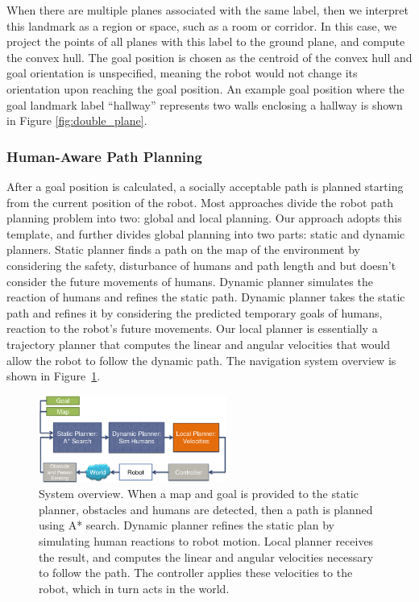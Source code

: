 \documentclass[3p]{elsarticle}
\begin{document}
When there are multiple planes associated with the same label, then we interpret this landmark as a region or space, such as a room or corridor. In this case, we project the points of all planes with this label to the ground plane, and compute the convex hull. The goal position is chosen as the centroid of the convex hull and goal orientation is unspecified, meaning the robot would not change its orientation upon reaching the goal position. An example goal position where the goal landmark label ``hallway'' represents two walls enclosing a hallway is shown in Figure \ref{fig:double_plane}.

\subsubsection{Human-Aware Path Planning}
\label{sec:human_aware_path_planning}

After a goal position is calculated, a socially acceptable path is planned starting from the current position of the robot. Most approaches divide the robot path planning problem into two: global and local planning. Our approach adopts this template, and further divides global planning into two parts: static and dynamic planners. Static planner finds a path on the map of the environment by considering the safety, disturbance of humans and path length and but doesn't consider the future movements of humans. Dynamic planner simulates the reaction of humans and refines the static path. Dynamic planner takes the static path and refines it by considering the predicted temporary goals of humans, reaction to the robot's future movements. Our local planner is essentially a trajectory planner that computes the linear and angular velocities that would allow the robot to follow the dynamic path. The navigation system overview is shown in Figure~\ref{fig:navigation_overview}.

\begin{figure}[ht!]
\centering
\includegraphics[width=0.55\textwidth]{pics/overview_crop.png}
\caption{System overview. When a map and goal is provided to the static planner, obstacles and humans are detected, then a path is planned using A* search. Dynamic planner refines the static plan by simulating human reactions to robot motion. Local planner receives the result, and computes the linear and angular velocities necessary to follow the path. The controller applies these velocities to the robot, which in turn acts in the world.}
\label{fig:navigation_overview}
\end{figure}
\end{document}
